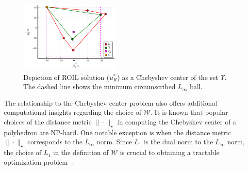 \documentclass[10pt]{article}
\renewcommand{\cite}{\citep}
\theoremstyle{plain}
\theoremstyle{remark}
\newcommand{\gersi}[1]{\textcolor{red}{[#1]}}
\begin{document}






\begin{figure}
    \centering
    \includegraphics[width=0.45\textwidth]{../notebooks/plots/visual_solve_cheb.pdf}
    \caption{Depiction of ROIL solution ($u^*_R$) as a Chebyshev center of the set $\Upsilon$. The dashed line shows the minimum circumscribed  $L_{\infty}$ ball.
    }
    \label{fig:visual_representation_of_ROIL}
\end{figure}


The relationship to the Chebyshev center problem also offers additional computational insights regarding the choice of $\mathcal{W}$. It is known that popular choices of the distance metric $\| \cdot  \|_{\star}$ in computing the Chebyshev center of a polyhedron are NP-hard. One notable exception is when the distance metric $\| \cdot \|_{\star}$ corresponds to the $L_{\infty}$ norm. Since $L_1$ is the dual norm to the $L_{\infty}$ norm, the choice of $L_1$ in the definition of $\mathcal{W}$ is crucial to obtaining a tractable optimization problem~\cite{Wu2013, Eldar2008}.
\end{document}
